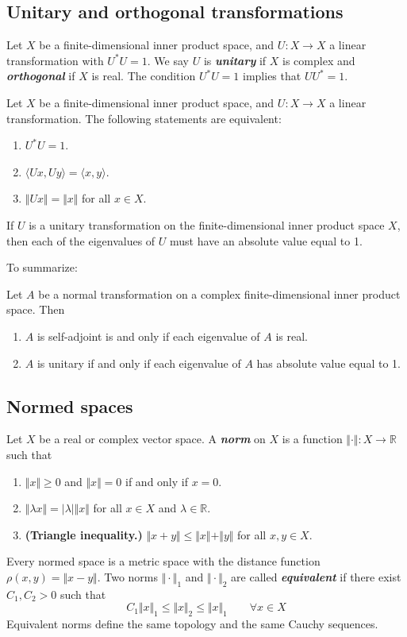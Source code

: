 \documentclass{article}
\theoremstyle{definition}
\numberwithin{equation}{section}
\newcommand{\R}{\mathbb{R}}
\begin{document}
	\subsection{Unitary and orthogonal transformations}
	Let $X$ be a finite-dimensional inner product space, and $U:X\to X$ a linear transformation with $U^*U=1$. We say $U$ is \textbf{\textit{unitary}} if $X$ is complex and \textbf{\textit{orthogonal}} if $X$ is real. The condition $U^*U=1$ implies that $UU^*=1$.
	
	\begin{thm}
		Let $X$ be a finite-dimensional inner product space, and $U:X\to X$ a linear transformation. The following statements are equivalent:
		\begin{enumerate}
			\item $U^*U=1$.
			\item $\langle Ux,Uy\rangle=\langle x,y\rangle$.
			\item $\Vert Ux\Vert=\Vert x\Vert$ for all $x\in X$.
		\end{enumerate}
	\end{thm}
	\begin{thm}
		If $U$ is a unitary transformation on the finite-dimensional inner product space $X$, then each of the eigenvalues of $U$ must have an absolute value equal to 1.
	\end{thm}
	To summarize:
	\begin{thm}
		Let $A$ be a normal transformation on a complex finite-dimensional inner product space. Then
		\begin{enumerate}
			\item $A$ is self-adjoint is and only if each eigenvalue of $A$ is real.
			\item $A$ is unitary if and only if each eigenvalue of $A$ has absolute value equal to 1.
		\end{enumerate}
	\end{thm}
	
	\subsection{Normed spaces}
	Let $X$ be a real or complex vector space. A \textbf{\textit{norm}} on $X$ is a function $\Vert \cdot\Vert:X\to\R$ such that
	\begin{enumerate}
		\item $\Vert x\Vert\geq0$ and $\Vert x\Vert=0$ if and only if $x=0$.
		\item $\Vert\lambda x\Vert=|\lambda|\Vert x\Vert$ for all $x\in X$ and $\lambda\in\R$.
		\item \textbf{(Triangle inequality.)} $\Vert x+y\Vert\leq\Vert x\Vert+\Vert y\Vert$ for all $x,y\in X$.
	\end{enumerate}
	Every normed space is a metric space with the distance function $\rho(x,y)=\Vert x-y\Vert$. Two norms $\Vert\cdot\Vert_1$ and $\Vert\cdot\Vert_2$ are called \textbf{\textit{equivalent}} if there exist $C_1,C_2>0$ such that
	\[C_1\Vert x\Vert_1\leq \Vert x\Vert_2\leq \Vert x\Vert_1\qquad\forall x\in X\]
	Equivalent norms define the same topology and the same Cauchy sequences.
	
\end{document}
